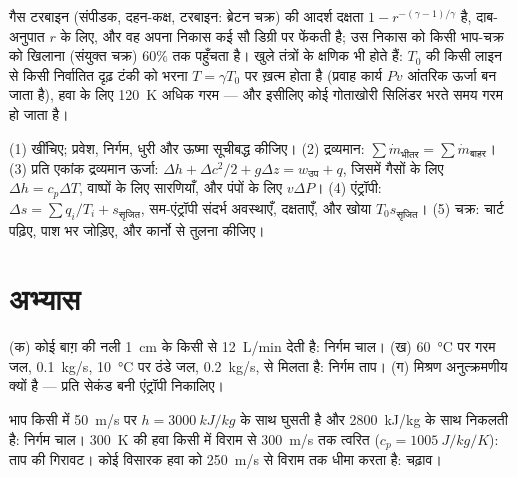 \begin{remark}[दूसरे चक्र, और कोई क्षणिक]\label{rem:b2:open-systems:other}
गैस टरबाइन (संपीडक, दहन-कक्ष, टरबाइन: ब्रेटन
चक्र) की आदर्श दक्षता $1 - r^{-(\gamma-1)/\gamma}$ है, दाब-अनुपात $r$ के लिए,
और वह अपना निकास कई सौ डिग्री पर फेंकती है;
उस निकास को किसी भाप-चक्र को खिलाना (संयुक्त चक्र) $60\%$ तक पहुँचता है।
खुले तंत्रों के क्षणिक भी होते हैं: $T_0$ की किसी लाइन से किसी निर्वातित दृढ़
टंकी को भरना $T = \gamma T_0$ पर ख़त्म होता है (प्रवाह कार्य $Pv$
आंतरिक ऊर्जा बन जाता है), हवा के लिए \qty{120}{K} अधिक गरम --- और इसीलिए
कोई गोताखोरी सिलिंडर भरते समय गरम हो जाता है।
\end{remark}

\begin{method}[खुले-तंत्र के संतुलन]\label{meth:b2:open-systems:method}
(1)  खींचिए; प्रवेश, निर्गम, धुरी और ऊष्मा सूचीबद्ध कीजिए।
(2) द्रव्यमान: $\sum\dot m_{\text{भीतर}} = \sum\dot m_{\text{बाहर}}$। (3) प्रति एकांक
द्रव्यमान ऊर्जा: $\Delta h + \Delta c^2/2 + g\Delta z = w_{\text{उप}} + q$, जिसमें
गैसों के लिए $\Delta h = c_p\Delta T$, वाष्पों के लिए सारणियाँ, और पंपों के लिए
$v\Delta P$। (4) एंट्रॉपी: $\Delta s = \sum q_i/T_i + s_{\text{सृजित}}$, सम-एंट्रॉपी
संदर्भ अवस्थाएँ, दक्षताएँ, और खोया $T_0s_{\text{सृजित}}$। (5) चक्र:
चार्ट पढ़िए, पाश भर जोड़िए, और कार्नो से तुलना कीजिए।
\end{method}

\section{अभ्यास}

\begin{exercise}[$\star$]\label{exo:b2:open-systems:1}
(क) कोई बाग़ की नली \qty{1}{cm} के किसी  से \qty{12}{L/min}
देती है: निर्गम चाल। (ख) \qty{60}{\celsius} पर गरम जल, \qty{0.1}{kg/s},
\qty{10}{\celsius} पर ठंडे जल, \qty{0.2}{kg/s}, से मिलता है: निर्गम
ताप। (ग) मिश्रण अनुत्क्रमणीय क्यों है --- प्रति सेकंड बनी
एंट्रॉपी निकालिए।
\end{exercise}

\begin{exercise}[$\star$]\label{exo:b2:open-systems:2}
भाप किसी  में \qty{50}{m/s} पर $h = \qty{3000}{kJ/kg}$ के साथ घुसती है और
\qty{2800}{kJ/kg} के साथ निकलती है: निर्गम चाल। \qty{300}{K} की हवा किसी  में
विराम से \qty{300}{m/s} तक त्वरित ($c_p = \qty{1005}{J/kg/K}$):
ताप की गिरावट। कोई विसारक हवा को \qty{250}{m/s} से विराम तक धीमा करता है: चढ़ाव।
\end{exercise}

